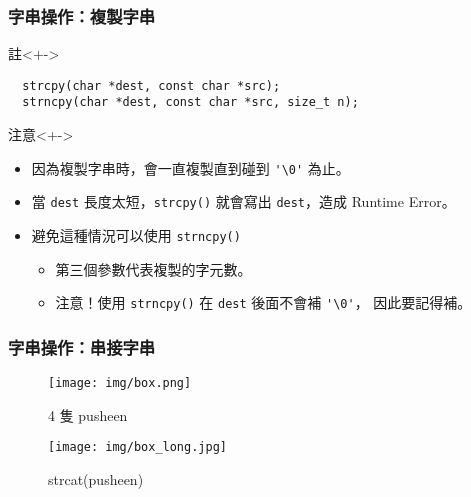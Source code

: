 \documentclass[utf8]{beamer}
\begin{document}
\begin{CJK}{UTF8}{bkai}
\begin{frame}[fragile]
  \frametitle{字串操作：複製字串}
  \begin{alertblock}{註}<+->
    \begin{lstlisting}
  strcpy(char *dest, const char *src);
  strncpy(char *dest, const char *src, size_t n);
    \end{lstlisting}
  \end{alertblock}
  \begin{exampleblock}{注意}<+->
    \begin{itemize}[<+->]
    \item 因為複製字串時，會一直複製\alert{直到}碰到 \lstinline{'\0'}{} 為止。
    \item 當 \lstinline{dest}{} 長度太短，\lstinline{strcpy()}{} 就會寫出 \lstinline{dest}{}，造成 Runtime Error。
    \item 避免這種情況可以使用 \lstinline{strncpy()}{}
      \begin{itemize}
      \item 第三個參數代表複製的字元數。
      \item \alert{注意！}使用 \lstinline{strncpy()}{} 在 \lstinline{dest}{} 後面不會補 \lstinline{'\0'}{}， 因此要記得補。
      \end{itemize}
    \end{itemize}
  \end{exampleblock}
\end{frame}

\begin{frame}[fragile]
  \frametitle{字串操作：串接字串}
  \onslide<+->
  \begin{figure}[h]
    \caption{4 隻 pusheen}
    \centering\texttt{[image: img/box.png]}
  \end{figure}
  \onslide<+->
  \begin{figure}[h]
    \caption{strcat(pusheen)}
    \centering\texttt{[image: img/box\_long.jpg]}
  \end{figure}
\end{frame}


\end{CJK}
\end{document}
